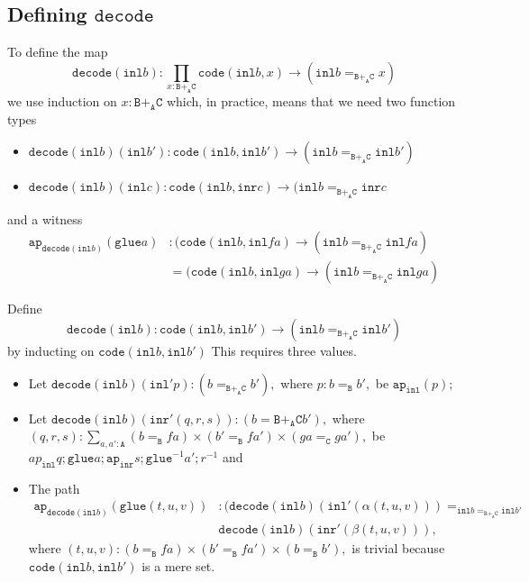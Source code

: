 \documentclass[12pt]{amsart}
\newcommand{\from}{\colon}
\newcommand{\type}[1]{\mathtt{#1}}
\newcommand{\tin}{\colon}
\newcommand{\A}{\type{A}}
\newcommand{\B}{\type{B}}
\newcommand{\C}{\type{C}}
\newcommand{\BAC}{\B +_{\A} \C}
\newcommand{\ap}{\type{ap}}
\newcommand{\inl}{\type{inl}}
\newcommand{\inr}{\type{inr}}
\newcommand{\glue}{\type{glue}}
\newcommand{\code}{\type{code}}
\newcommand{\decode}{\type{decode}}
\theoremstyle{remark}
\theoremstyle{definition}
\begin{document}

\subsection{Defining \( \decode \)}
\label{sec:define-decode}

To define the map
%
\begin{equation} \label{eq:decode-b-blank}
%
  \decode ( \inl b ) \from
  \prod\limits_{x \tin \BAC} \code ( \inl b , x ) \to
  ( \inl b =_{\BAC} x )
%
\end{equation}
%
we use induction on \( x \tin \BAC \) which, in practice, means that
we need two function types
%
\begin{itemize}
\item
  \(
    \decode ( \inl b ) ( \inl b' ) \from
    \code (\inl b , \inl b') \to
    ( \inl b =_{\BAC} \inl b' )
  \)
\item
  \(
    \decode ( \inl b ) ( \inl c ) \from
    \code ( \inl b , \inr c ) \to
    ( \inl b =_{\BAC} \inr c
  \) 
\end{itemize}
%
and a witness
%
\begin{align*}
  \ap_{\decode ( \inl b )} (\glue a) &
  \tin
  ( \code ( \inl b , \inl fa ) \to ( \inl b =_{\BAC} \inl fa ) \\
  & =
  ( \code ( \inl b , \inl ga ) \to ( \inl b =_{\BAC} \inl ga )
\end{align*}


Define
\[
  \decode ( \inl b ) \from
  \code ( \inl b , \inl b' ) \to
  ( \inl b =_{\BAC} \inl b' )
\]
by inducting on
%
\(
    \code ( \inl b , \inl b' )
\)
% 
This requires three values.
%
\begin{itemize}
\item
  Let
  \(
    \decode ( \inl b) (\inl' p) \tin ( b =_{\BAC} b' ),
  \)
  where
  \(
    p \tin b =_{\B} b',
  \)
  be
  \(
    \ap_{\inl} (p);
  \)
\item
  Let
  \(
    \decode (\inl b ) ( \inr' (q,r,s) ) \tin ( b ={\BAC} b' ),
  \)
  where
  \(
    (q,r,s) \tin
    \sum\limits_{a,a' \tin \A}
    ( b =_\B fa ) \times (b' =_\B fa' ) \times ( ga =_\C ga' ),
  \)  
  be
  \(
    ap_{\inl} q ; \glue a ; \ap_{\inr} s ; \glue^{-1} a' ; r^{-1}
  \)
  and
\item
  The path
  \begin{align*}
    \ap_{\decode ( \inl b )} ( \glue (t,u,v) )
    & \tin ( \decode ( \inl b )
      ( \inl' ( \alpha (t,u,v) ) ) =_{\inl b =_{\BAC} \inl b'} \\
    & \decode ( \inl b ) ( \inr' ( \beta (t,u,v) ) ),
  \end{align*}
  where
  \(
    (t,u,v) \tin
    ( b =_\B fa ) \times ( b' =_\B fa' ) \times ( b =_\B b' ),
  \)
  is trivial because
  \(
    \code ( \inl b , \inl b' )
  \)
  is a mere set.
\end{itemize}
\end{document}
